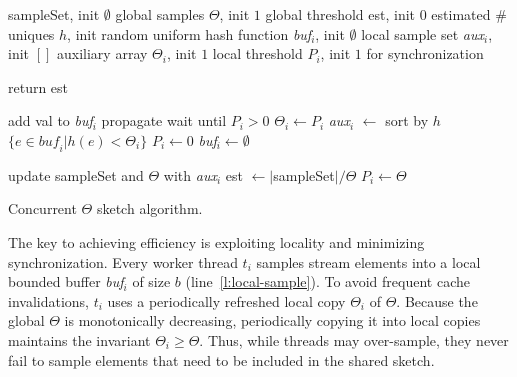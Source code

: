 \begin{algorithm}[tb]
\small
\begin{multicols}{2}
\begin{algorithmic}[1]

\Vars
\State   sampleSet, init $\emptyset$ \Comment global samples
\State  $\Theta$, init $1$			\Comment global threshold
 est, init $0$ \Comment estimated \# uniques
\State $h$, init random uniform hash function 
\Statex
{} 
	\State \emph{buf$_i$}, init $\emptyset$ \Comment local sample set
	\State \emph{aux$_i$}, init $[ ]$ \Comment auxiliary array
	\State $\Theta_i$, init $1$ 	\Comment local threshold
	 $P_i$, init $1$ \Comment for synchronization
\EndFor
\EndFor

\Statex
{}
\State return est \label{l:query}
\EndProcedure

	add val to \emph{buf$_i$} \label{l:local-sample}
\EndIf
{} \Comment propagate
	\State wait until $P_i >0$ \label{l:wait}
	\State $\Theta_i \leftarrow P_i$ \label{l:adopt}
	\State \emph{aux$_i$}  $\leftarrow$ sort by $h$ $\{ e \in \mathit{buf_i} | h(e) <\Theta_i \}$
		\label{l:sort}
	\State $P_i \leftarrow 0$ 		\label{l:signal}
	\State \emph{buf$_i$}$ \leftarrow \emptyset$  \label{l:clean} 

\EndIf  
\EndProcedure

		\State  update sampleSet and $\Theta$ with \emph{aux$_i$} \label{l:aux}
		\State est $\leftarrow |$sampleSet$|/ \Theta$ \label{l:update-est}
		\State $P_i \leftarrow \Theta$  \label{l:theta}
\EndFor
\EndWhile
\EndProcedure

\end{algorithmic}
\end{multicols}
\caption{Concurrent $\Theta$ sketch algorithm.}
\label{alg:concurrent-theta}
\end{algorithm}

The key to achieving efficiency is exploiting locality and minimizing synchronization.
Every worker thread $t_i$ samples stream elements into a local bounded buffer 
\emph{buf$_i$} of size $b$ (line~\ref{l:local-sample}). 
To avoid frequent cache invalidations, $t_i$ uses a periodically refreshed
local copy $\Theta_i$ of $\Theta$. 
Because the global  $\Theta$ is monotonically decreasing, periodically copying it
into local copies maintains the invariant $\Theta_i \geq \Theta$.
Thus, while threads may over-sample, they never fail to sample elements that need 
to be included in the shared sketch. 

